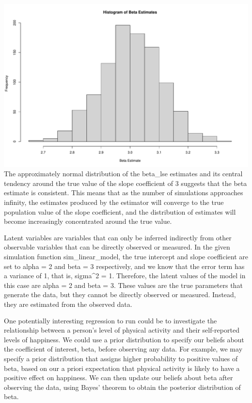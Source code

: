 \documentclass[
  a4paper,
]{article}
\begin{document}
\includegraphics{RMarkdown_files/figure-latex/global_options4-2.pdf} The
approximately normal distribution of the beta\_lse estimates and its
central tendency around the true value of the slope coefficient of 3
suggests that the beta estimate is consistent. This means that as the
number of simulations approaches infinity, the estimates produced by the
estimator will converge to the true population value of the slope
coefficient, and the distribution of estimates will become increasingly
concentrated around the true value.

Latent variables are variables that can only be inferred indirectly from
other observable variables that can be directly observed or measured. In
the given simulation function sim\_linear\_model, the true intercept and
slope coefficient are set to alpha = 2 and beta = 3 respectively, and we
know that the error term has a variance of 1, that is, sigma\^{}2 = 1.
Therefore, the latent values of the model in this case are alpha = 2 and
beta = 3. These values are the true parameters that generate the data,
but they cannot be directly observed or measured. Instead, they are
estimated from the observed data.

One potentially interesting regression to run could be to investigate
the relationship between a person's level of physical activity and their
self-reported levels of happiness. We could use a prior distribution to
specify our beliefs about the coefficient of interest, beta, before
observing any data. For example, we may specify a prior distribution
that assigns higher probability to positive values of beta, based on our
a priori expectation that physical activity is likely to have a positive
effect on happiness. We can then update our beliefs about beta after
observing the data, using Bayes' theorem to obtain the posterior
distribution of beta.
\end{document}
